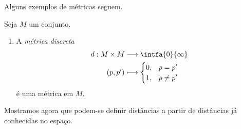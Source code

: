 Alguns exemplos de métricas seguem.

\begin{prop}
Seja $M$ um conjunto.
	\begin{enumerate}
	\item A \emph{métrica discreta}
		\begin{align*}
		\func{d}{M \times M}{\intfa{0}{\infty}}{(p,p')}{
			\begin{cases}
				0,& p = p' \\
				1,& p \neq p'
			\end{cases}
		}
		\end{align*}
é uma métrica em $M$.

	\end{enumerate}
\end{prop}

Mostramos agora que podem-se definir distâncias a partir de distâncias já conhecidas no espaço.

